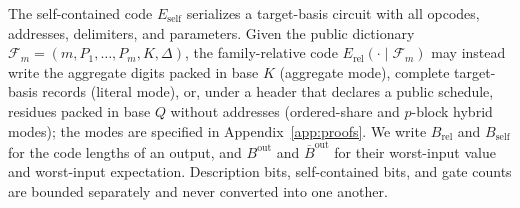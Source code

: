 \begin{definition}
\label{def:info-budget-bits}
The self-contained code $E_{\mathrm{self}}$ serializes a target-basis
circuit with all opcodes, addresses, delimiters, and parameters.  Given
the public dictionary $\mathcal F_m=(m,P_1,\ldots,P_m,K,\Delta)$, the
family-relative code $E_{\mathrm{rel}}(\cdot\mid\mathcal F_m)$ may
instead write the aggregate digits packed in base $K$ (aggregate mode),
complete target-basis records (literal mode), or, under a header that
declares a public schedule, residues packed in base $Q$ without addresses
(ordered-share and $p$-block hybrid modes); the modes are specified in
Appendix~\ref{app:proofs}.  We write $B_{\mathrm{rel}}$ and $B_{\mathrm{self}}$
for the code lengths of an output, and $B^{\mathrm{out}}$ and
$\overline B^{\mathrm{out}}$ for their worst-input value and worst-input
expectation.  Description bits, self-contained bits, and gate counts are
bounded separately and never converted into one another.
\end{definition}
